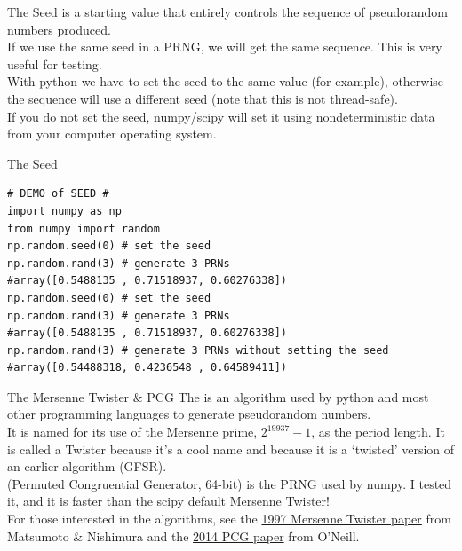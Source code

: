 \documentclass[10pt,sans,english,compress,xcolor=dvipsnames]{beamer}
\begin{document}
\begin{frame}[fragile]{The Seed}
\footnotesize
{} is a starting value that entirely controls the sequence of pseudorandom numbers produced.\\[1ex]

If we use the same seed in a PRNG, we will get the same sequence. This is very useful for testing.\\[1ex]

With python  we have to set the seed to the same value  (for example), otherwise the sequence will use a different seed (note that this is not thread-safe).\\[1ex]

If you do not set the seed, numpy/scipy will set it using nondeterministic data from your computer operating system.\\[1ex]
\end{frame} 



\begin{frame}[fragile]{The Seed}
\footnotesize
\begin{verbatim}
# DEMO of SEED #
import numpy as np
from numpy import random
np.random.seed(0) # set the seed
np.random.rand(3) # generate 3 PRNs
#array([0.5488135 , 0.71518937, 0.60276338])
np.random.seed(0) # set the seed
np.random.rand(3) # generate 3 PRNs
#array([0.5488135 , 0.71518937, 0.60276338])
np.random.rand(3) # generate 3 PRNs without setting the seed
#array([0.54488318, 0.4236548 , 0.64589411])
\end{verbatim}

\end{frame} 

\begin{frame}[fragile]{The Mersenne Twister \& PCG}
\footnotesize
The  is an algorithm used by python and most other programming languages to generate pseudorandom numbers. \\[1ex]

It is named for its use of the Mersenne prime,  $2^{19937} -1$, as the period length. It is called a Twister because it's a cool name and because it is a `twisted' version of an earlier algorithm (GFSR).\\[1ex]

  (Permuted Congruential Generator, 64-bit) is the PRNG used by numpy. I tested it, and it is faster than the scipy default Mersenne Twister!\\[1ex]

For those interested in the algorithms, see the \href{https://www.nature.com/articles/s41586-025-09054-3}{1997 Mersenne Twister paper} from Matsumoto \& Nishimura and the \href{https://www.pcg-random.org/pdf/hmc-cs-2014-0905.pdf}{2014 PCG paper} from O'Neill.

\end{frame} 
\end{document}
